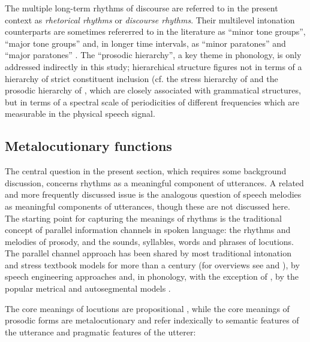 \documentclass[output=paper,colorlinks,citecolor=brown]{langscibook}
\begin{document}
The multiple long-term rhythms of discourse are referred to in the present context as \textit{rhetorical rhythms} or \textit{discourse rhythms}. Their multilevel intonation counterparts are sometimes refererred to in the literature as ``minor tone groups'', ``major tone groups'' \citep{trim1959} and, in longer time intervals, as ``minor paratones'' and ``major paratones'' \citep{yuleparatone1980}. The “prosodic hierarchy”, a key theme in phonology, is only addressed indirectly in this study; hierarchical structure figures not in terms of a hierarchy of strict constituent inclusion (cf. the stress hierarchy of \citet{chomskyhalle1968} and the prosodic hierarchy of \citet{selkirk1984}, which are closely associated with grammatical structures, but in terms of a spectral scale of periodicities of different frequencies which are measurable in the physical speech signal.

\subsection{Metalocutionary functions}

The central question in the present section, which requires some background discussion, concerns rhythms as a meaningful component of utterances. A related and more frequently discussed issue is the analogous question of speech melodies as meaningful components of utterances, though these are not discussed here. The starting point for capturing the meanings of rhythms is the traditional concept of parallel information channels in spoken language: the rhythms and melodies of prosody, and the sounds, syllables, words and phrases of locutions. The parallel channel approach has been shared by most traditional intonation and stress textbook models for more than a century (for overviews see \citet{gibbon1976} and \citet{arvaniti2022}), by speech engineering approaches \citep{morikawafujisaki1976, thartcohen73, dutoit2001, fujisaki2004} and, in phonology, with the exception of , by the popular metrical and autosegmental models \citep{barnesshattuckhufnagel2022}.

The core meanings of locutions are propositional \citep{Austin1962}, while the core meanings of prosodic forms are metalocutionary \citep{gibbon1976, gibbonmetalocution1981} and refer indexically to semantic features of the utterance and pragmatic features of the utterer:
\end{document}
